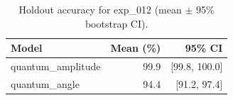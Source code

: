 \begin{table}[ht]
\centering
\caption{Holdout accuracy for exp_012 (mean $\pm$ 95\% bootstrap CI).}
\label{tab:exp_012}
\begin{tabular}{lrr}
\toprule
Model & Mean (\%) & 95\% CI \\
\midrule
quantum\_amplitude & 99.9 & [99.8, 100.0] \\
quantum\_angle & 94.4 & [91.2, 97.4] \\
\bottomrule
\end{tabular}
\end{table}
